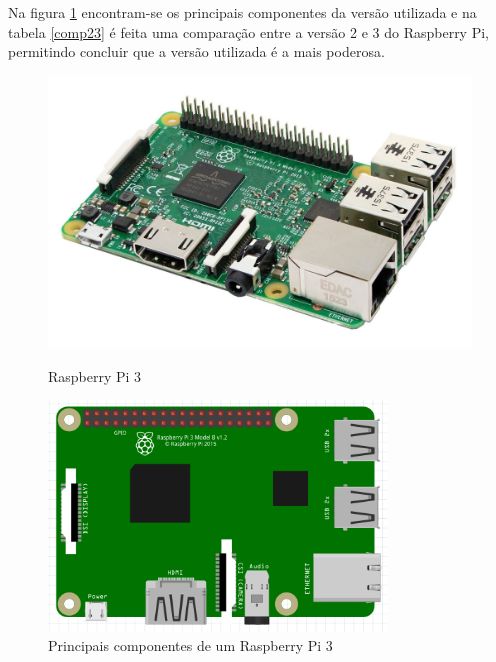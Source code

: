  Na figura \ref{comprasp1} encontram-se os principais componentes da versão utilizada e na tabela \ref{comp23} é feita uma comparação entre a versão 2 e 3 do Raspberry Pi, permitindo concluir que a versão utilizada é a mais poderosa. 



\begin{figure}[h]
	\centering
	\begin{minipage}[b]{0.49\textwidth}
		\centering
		\includegraphics[width=\textwidth]{img/hardware/rasp3-img.jpg}
		\caption{Raspberry Pi 3}
		\label{rasp1}
	\end{minipage}
	\hfill
	\begin{minipage}[b]{0.49\textwidth}
		\centering
		\includegraphics[width=0.8\textwidth]{img/hardware/rasp-esquema.PNG}
		\caption{Principais componentes de um Raspberry Pi 3 }
		\label{comprasp1}
		
	\end{minipage}
\end{figure}




